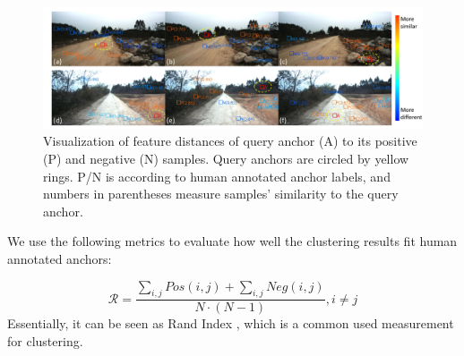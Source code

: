 \documentclass[letterpaper, 10 pt, conference]{ieeeconf}  %
\begin{document}
\begin{figure}[b]
	\centering
	\includegraphics[scale=0.4]{anchor_dis.pdf}
	\caption{Visualization of feature distances of query anchor (A) to its positive (P) and negative (N) samples. Query anchors are circled by yellow rings. P/N is according to human annotated anchor labels, and numbers in parentheses measure samples' similarity to the query anchor.}
	\label{fig:anchor_dis}
\end{figure}

We use the following metrics to evaluate how well the clustering results fit human annotated anchors:

\begin{equation}
\mathcal{R}=\dfrac{\sum_{i,j}{Pos(i,j)}+\sum_{i,j}{Neg(i,j)}}{N\cdot (N-1)}, i \neq j
\end{equation}
Essentially, it can be seen as Rand Index \cite{rand1971objective}, which is a common used measurement for clustering.
\end{document}
